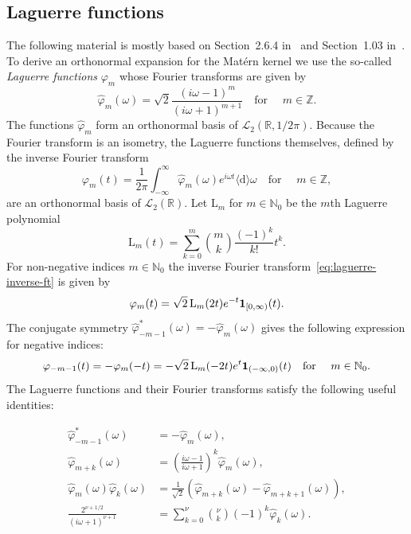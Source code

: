 \documentclass{article}
\newcommand{\mathd}{\mathrm{d}}
\newcommand{\tmem}[1]{{\em #1\/}}
\newcommand{\R}{\mathbb{R}}
\newcommand{\N}{\mathbb{N}}
\newcommand{\dif}{ \langle \mathd \rangle }
\begin{document}
\subsection{Laguerre functions}\label{sec:laguerre-functions}

The following material is mostly based on Section~2.6.4
in~{\cite{Higgins1977}} and Section~1.03 in~{\cite{Wiener1949}}. To derive an
orthonormal expansion for the Mat{\'e}rn kernel we use the so-called
{\tmem{Laguerre functions}} $\varphi_m$ whose Fourier transforms are given by
\begin{equation}
  \label{eq:laguerre-func-ft} \hat{\varphi}_m (\omega) = \sqrt{2}  \frac{(i
  \omega - 1)^m}{(i \omega + 1)^{m + 1}}  \quad \text{for } \quad m \in
  \mathbb{Z}.
\end{equation}
The functions $\hat{\varphi}_m$ form an orthonormal basis of $\mathscr{L}_2
(\mathbb{R}, 1 / 2 \pi)$. Because the Fourier transform is an isometry, the
Laguerre functions themselves, defined by the inverse Fourier transform
\begin{equation}
  \label{eq:laguerre-inverse-ft} \varphi_m (t) = \frac{1}{2 \pi}  \int_{-
  \infty}^{\infty} \hat{\varphi}_m (\omega) e^{i \omega t} \dif \omega \quad
  \text{for } \quad m \in \mathbb{Z},
\end{equation}
are an orthonormal basis of $\mathscr{L}_2 (\R)$. Let $\mathrm{L}_m$ for $m
\in \N_0$ be the $m$th Laguerre polynomial
\begin{equation}
  \label{eq:laguerre-polynomial} \mathrm{L}_m (t) = \sum_{k = 0}^m
  \binom{m}{k} \frac{(- 1)^k}{k!} t^k .
\end{equation}
For non-negative indices $m \in \N_0$ the inverse Fourier
transform~\eqref{eq:laguerre-inverse-ft} is given by
\begin{equation}
  \label{eq:phi-m-matern-non-negative} \varphi_m (t) = \sqrt{2}
  \hspace{0.17em} \mathrm{L}_m (2 t) e^{- t}  \textbf{1}_{[0, \infty)} (t) .
\end{equation}
The conjugate symmetry $\hat{\varphi}_{- m - 1}^{\ast} (\omega) = -
\hat{\varphi}_m (\omega)$ gives the following expression for negative indices:
\[ \varphi_{- m - 1} (t) = - \varphi_m  (- t) = - \sqrt{2} \hspace{0.17em}
   \mathrm{L}_m (- 2 t) e^t  \textbf{1}_{(- \infty, 0)} (t)  \quad \text{for }
   \quad m \in \mathbb{N}_0 . \]
The Laguerre functions and their Fourier transforms satisfy the following
useful identities:

\begin{align*}
  \hat{\varphi}_{- m - 1}^{\ast} (\omega) & = - \hat{\varphi}_m (\omega),\\
  \hat{\varphi}_{m + k} (\omega) & = \left( \frac{i \omega - 1}{i \omega + 1}
  \right)^k  \hat{\varphi}_m (\omega),\\
  \hat{\varphi}_m (\omega)  \hat{\varphi}_k (\omega) & = \frac{1}{\sqrt{2}} 
  (\hat{\varphi}_{m + k} (\omega) - \hat{\varphi}_{m + k + 1} (\omega)),\\
  \frac{2^{\nu + 1 / 2}}{(i \omega + 1)^{\nu + 1}} & = \sum_{k = 0}^{\nu}
  \binom{\nu}{k} (- 1)^k  \hat{\varphi}_k (\omega) .\\
  & 
\end{align*}
\end{document}
